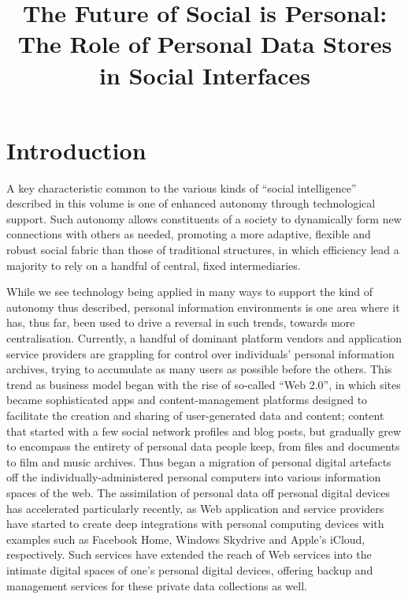 \documentclass[runningheads,a4paper]{llncs}
\begin{document}
\title{The Future of Social is Personal: The Role of Personal Data Stores in Social Interfaces}


\maketitle

\section{Introduction}

A key characteristic common to the various kinds of ``social intelligence'' described in this volume is one of enhanced autonomy through technological support.  Such autonomy allows constituents of a society to dynamically form new connections with others as needed, promoting a more adaptive, flexible and robust social fabric than those of traditional structures, in which efficiency lead a majority to rely on a handful of central, fixed intermediaries.  

While we see technology being applied in many ways to support the kind of autonomy thus described, personal information environments is one area where it has, thus far, been used to drive a reversal in such trends, towards more centralisation. Currently, a handful of dominant platform vendors and application service providers are grappling for control over individuals' personal information archives, trying to accumulate as many users as possible before the others. This trend as business model began with the rise of so-called ``Web 2.0'', in which sites became sophisticated apps and content-management platforms designed to facilitate the creation and sharing of user-generated data and content; content that started with a few social network profiles and blog posts, but gradually grew to encompass the entirety of personal data people keep, from files and documents to film and music archives. Thus began a migration of personal digital artefacts off the individually-administered personal computers into various information spaces of the web.  The assimilation of personal data off personal digital devices has accelerated particularly recently, as Web application and service providers have started to create deep integrations with personal computing devices with examples such as Facebook Home\cite{facebook}, Windows Skydrive\cite{skydrive} and Apple's iCloud\cite{icloud}, respectively. Such services have extended the reach of Web services into the intimate digital spaces of one's personal digital devices, offering backup and management services for these private data collections as well.
\end{document}
